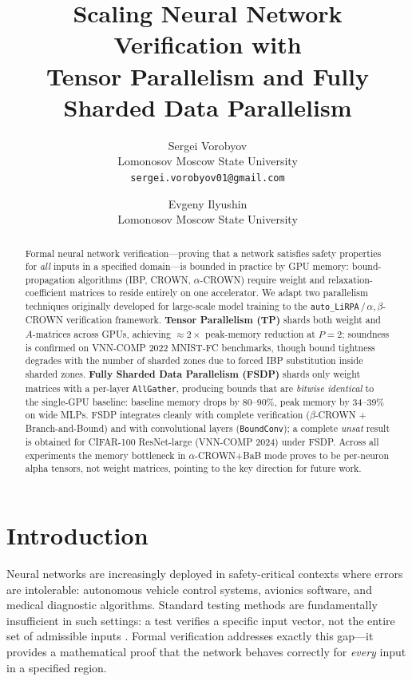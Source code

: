 \documentclass[11pt]{article}
\title{\textbf{Scaling Neural Network Verification with\\
Tensor Parallelism and Fully Sharded Data Parallelism}}
\author{%
  Sergei Vorobyov \\
  Lomonosov Moscow State University \\
  \texttt{sergei.vorobyov01@gmail.com}
  \and
  Evgeny Ilyushin \\
  Lomonosov Moscow State University
}
\date{}
\begin{document}
\maketitle

\begin{abstract}
Formal neural network verification---proving that a network satisfies safety
properties for \emph{all} inputs in a specified domain---is bounded in practice
by GPU memory: bound-propagation algorithms (IBP, CROWN, $\alpha$-CROWN)
require weight and relaxation-coefficient matrices to reside entirely on one
accelerator. We adapt two parallelism techniques originally developed for
large-scale model training to the \texttt{auto\_LiRPA}\,/\,$\alpha,\beta$-CROWN
verification framework. \textbf{Tensor Parallelism (TP)} shards both weight and
$A$-matrices across GPUs, achieving ${\approx}2\times$ peak-memory reduction at
$P{=}2$; soundness is confirmed on VNN-COMP 2022 MNIST-FC benchmarks, though
bound tightness degrades with the number of sharded zones due to forced IBP
substitution inside sharded zones. \textbf{Fully Sharded Data Parallelism
(FSDP)} shards only weight matrices with a per-layer \texttt{AllGather},
producing bounds that are \emph{bitwise identical} to the single-GPU baseline:
baseline memory drops by 80--90\%, peak memory by 34--39\% on wide MLPs.
FSDP integrates cleanly with complete verification ($\beta$-CROWN +
Branch-and-Bound) and with convolutional layers (\texttt{BoundConv}); a
complete \emph{unsat} result is obtained for CIFAR-100 ResNet-large
(VNN-COMP 2024) under FSDP. Across all experiments the memory bottleneck in
$\alpha$-CROWN+BaB mode proves to be per-neuron alpha tensors, not weight
matrices, pointing to the key direction for future work.
\end{abstract}

\section{Introduction}
\label{sec:intro}

Neural networks are increasingly deployed in safety-critical contexts where
errors are intolerable: autonomous vehicle control systems, avionics software,
and medical diagnostic algorithms. Standard testing methods are fundamentally
insufficient in such settings: a test verifies a specific input vector, not
the entire set of admissible inputs \citep{Guidotti2019Enhancing}. Formal
verification addresses exactly this gap---it provides a mathematical proof
that the network behaves correctly for \emph{every} input in a specified
region.
\end{document}
